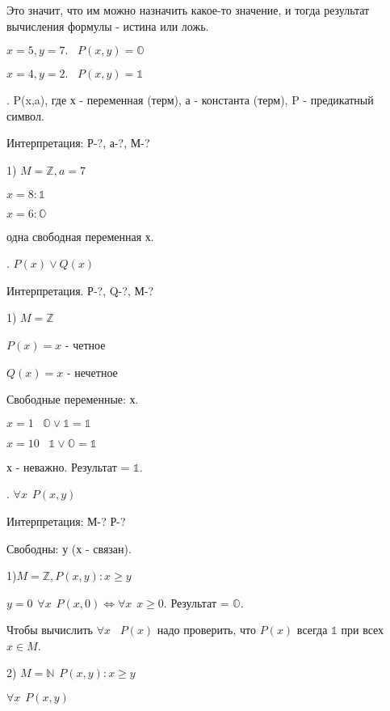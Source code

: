 \documentclass{article}
\begin{document}
Это значит, что им можно назначить какое-то значение, и тогда результат вычисления формулы - истина или ложь.

$x=5, y=7. \hspace{10pt} P(x,y)=\mathds{O}$

$x=4, y=2. \hspace{10pt} P(x,y)=\mathds{1}$

. P(x,a), где х - переменная (терм), а - константа (терм), P - предикатный символ.

Интерпретация: Р-?, а-?, М-?

1) $M=\mathds{Z}, a=7$

$x=8: \mathds{1}$

$x=6: \mathds{O}$

одна свободная переменная х.

. $P(x) \vee Q(x)$

Интерпретация.  Р-?, Q-?, М-?

1) $M=\mathds{Z}$

$P(x)= x$ - четное

$Q(x) = x$ - нечетное

Свободные переменные: х.

$x=1 \hspace{10pt} \mathds{O}\vee \mathds{1}=\mathds{1}$

$x=10 \hspace{10pt} \mathds{1}\vee \mathds{O}=\mathds{1}$

х - неважно. Результат = $\mathds{1}$.

. $\forall x \hspace{5pt} P(x,y)$

Интерпретация: М-? Р-?

Свободны: у (х - связан).

1)$M=\mathds{Z}, P(x,y): x\geqslant y$

$y=0 \hspace{5pt} \forall x \hspace{5pt} P(x,0) \Leftrightarrow \forall x \hspace{5pt} x\geqslant 0$. Результат = $\mathds{O}$.

Чтобы вычислить $\forall x \hspace{10pt} P(x) $ надо проверить, что $P(x)$ всегда $\mathds{1}$ при всех $x \in M$.

2) $M=\mathds{N} \hspace{5pt} P(x,y): x\geqslant y$

$\forall x \hspace{5pt} P(x,y)$
\end{document}
